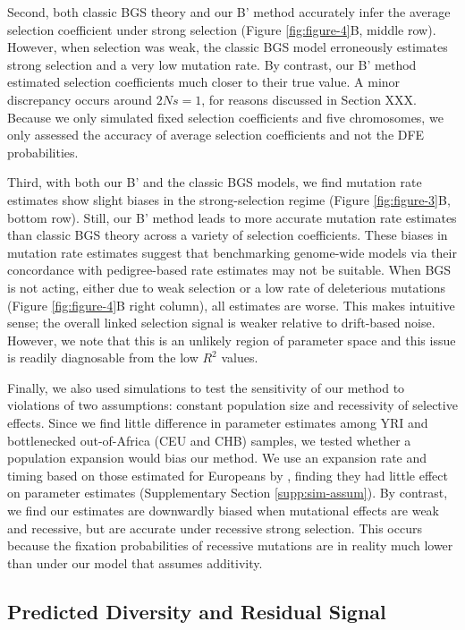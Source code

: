 \documentclass[11pt]{article}
\begin{document}
Second, both classic BGS theory and our B' method accurately infer the average
selection coefficient under strong selection (Figure \ref{fig:figure-4}B,
middle row). However, when selection was weak, the classic BGS model
erroneously estimates strong selection and a very low mutation rate. By
contrast, our B' method estimated selection coefficients much closer to their
true value. A minor discrepancy occurs around $2Ns = 1$, for reasons discussed
in Section XXX. Because we only simulated fixed selection coefficients and five
chromosomes, we only assessed the accuracy of average selection coefficients
and not the DFE probabilities.

Third, with both our B' and the classic BGS models, we find mutation rate
estimates show slight biases in the strong-selection regime (Figure
\ref{fig:figure-3}B, bottom row). Still, our B' method leads to more accurate
mutation rate estimates than classic BGS theory across a variety of selection
coefficients. These biases in mutation rate estimates suggest that benchmarking
genome-wide models via their concordance with pedigree-based rate estimates may
not be suitable. When BGS is not acting, either due to weak selection or a low
rate of deleterious mutations (Figure \ref{fig:figure-4}B right column), all
estimates are worse. This makes intuitive sense; the overall linked selection
signal is weaker relative to drift-based noise. However, we note that this is
an unlikely region of parameter space and this issue is readily diagnosable
from the low $R^2$ values.

Finally, we also used simulations to test the sensitivity of our method to
violations of two assumptions: constant population size and recessivity of
selective effects. Since we find little difference in parameter estimates among
YRI and bottlenecked out-of-Africa (CEU and CHB) samples, we tested whether a
population expansion would bias our method. We use an expansion rate and timing
based on those estimated for Europeans by \textcite{Gutenkunst2009-pg}, finding
they had little effect on parameter estimates (Supplementary Section
\ref{supp:sim-assum}). By contrast, we find our estimates are downwardly biased
when mutational effects are weak and recessive, but are accurate under
recessive strong selection. This occurs because the fixation probabilities of
recessive mutations are in reality much lower than under our model that assumes
additivity.

\subsection*{Predicted Diversity and Residual Signal}
\end{document}

